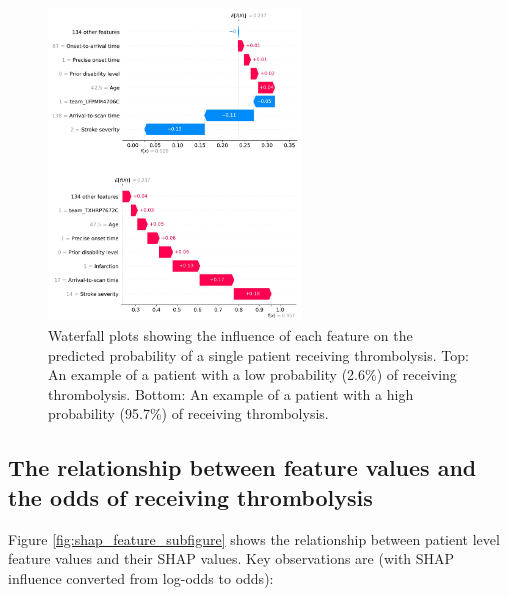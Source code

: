 \begin{figure}[!h]
\centering
\includegraphics[width=0.6\textwidth]{./images/waterfall}
\caption{Waterfall plots showing the influence of each feature on the predicted probability of a single patient receiving thrombolysis. Top: An example of a patient with a low probability (2.6\%) of receiving thrombolysis. Bottom: An example of a patient with a high probability (95.7\%) of receiving thrombolysis.}
\label{fig:results_waterfall}
\end{figure}


\subsection{The relationship between feature values and the odds of receiving thrombolysis}

Figure \ref{fig:shap_feature_subfigure} shows the relationship between patient level feature values and their SHAP values. Key observations are (with SHAP influence converted from log-odds to odds):

